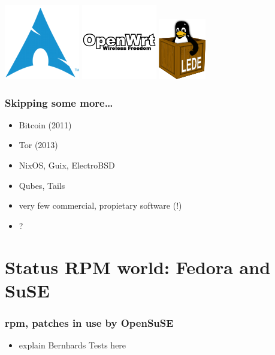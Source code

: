 \documentclass[14pt]{beamer}
\begin{document}
\begin{frame}
\begin{center}
  \hspace{0.05\paperwidth}
  \includegraphics[height=0.13\paperheight]{images/archlinux.png}
  \hspace{0.05\paperwidth}
  \includegraphics[height=0.3\paperheight]{images/openwrt.png}
  \hspace{0.05\paperwidth}
  \includegraphics[height=0.15\paperheight]{images/lede.png}
\end{center}
\end{frame}


\begin{frame}
 \frametitle{Skipping some more…}
 \begin{itemize}
\item Bitcoin (2011)
\item Tor (2013)
\item NixOS, Guix, ElectroBSD
\item Qubes, Tails
\item very few commercial, propietary software (!)
\item ?
 \end{itemize}
\end{frame}

\section{Status RPM world: Fedora and SuSE}

\begin{frame}
 \frametitle{rpm, patches in use by OpenSuSE}
 \begin{itemize}
  \item explain Bernhards Tests here
  \end{itemize}
\end{frame}
\end{document}
